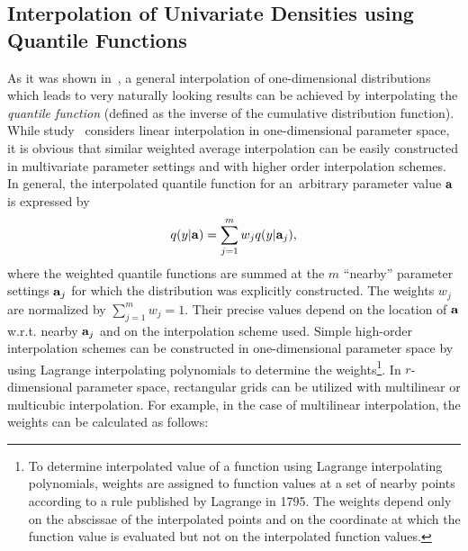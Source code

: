 \documentclass[12pt,titlepage]{article}
\begin{document}
\subsection{Interpolation of Univariate Densities using Quantile Functions}
\label{sec:interpolatebyquant}

As it was shown in~\cite{ref:read}, a general
interpolation of one-dimensional distributions which
leads to very naturally looking results
can be achieved by
interpolating the {\it quantile function} (defined as the
inverse of the cumulative distribution function). While study~\cite{ref:read}
considers linear interpolation in one-dimensional parameter space, it is obvious that
similar weighted average interpolation can be easily constructed in
multivariate parameter settings and with higher order interpolation
schemes. In general, the interpolated quantile function for  
an~arbitrary parameter value ${\bf a}$ is expressed by
\begin{equation}
\label{eq:quantileinterp1d}
q(y|{\bf a}) =  \sum_{j=1}^m w_j q(y|{\bf a}_j),
\end{equation}
where the weighted quantile functions are summed at the $m$ ``nearby''
parameter settings ${\bf a}_j$ for which the distribution was
explicitly constructed. The weights $w_j$ are normalized by
$\sum_{j=1}^m w_j = 1$.  Their precise values depend on the location
of ${\bf a}$ w.r.t. nearby ${\bf a}_j$ and on the interpolation scheme used.
Simple high-order interpolation schemes can be constructed
in one-dimensional parameter space by using Lagrange interpolating
polynomials
to determine the weights\footnote{To determine interpolated value of a function using
Lagrange interpolating polynomials, weights are assigned to function
values at a set of nearby points according to a rule
published by Lagrange in 1795. The weights depend only on the
abscissae of the interpolated points and on the coordinate
at which the function value is evaluated but not on the
interpolated function values.}. In $r$-dimensional parameter
space, rectangular grids can be utilized with multilinear or
multicubic interpolation. For
example, in the case of multilinear
interpolation, the weights can be calculated as follows:
\end{document}
